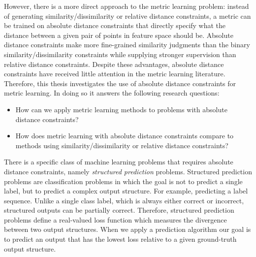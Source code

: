 However, there is a more direct approach to the metric learning problem: instead of generating similarity/dissimilarity or relative distance constraints, a metric can be trained on absolute distance constraints that directly specify what the distance between a given pair of points in feature space should be. Absolute distance constraints make more fine-grained similarity judgments than the binary similarity/dissimilarity constraints while supplying stronger supervision than relative distance constraints. Despite these advantages, absolute distance constraints have received little attention in the metric learning literature. Therefore, this thesis investigates the use of absolute distance constraints for metric learning. In doing so it answers the following research questions:
\begin{itemize}
\item How can we apply metric learning methods to problems with absolute distance constraints?
\item How does metric learning with absolute distance constraints compare to methods using similarity/dissimilarity or relative distance constraints?
\end{itemize}

There is a specific class of machine learning problems that requires absolute distance constraints, namely \emph{structured prediction} problems. Structured prediction problems are classification problems in which the goal is not to predict a single label, but to predict a complex output structure. For example, predicting a label sequence. Unlike a single class label, which is always either correct or incorrect, structured outputs can be partially correct. Therefore, structured prediction problems define a real-valued loss function which measures the divergence between two output structures. When we apply a prediction algorithm our goal is to predict an output that has the lowest loss relative to a given ground-truth output structure.

